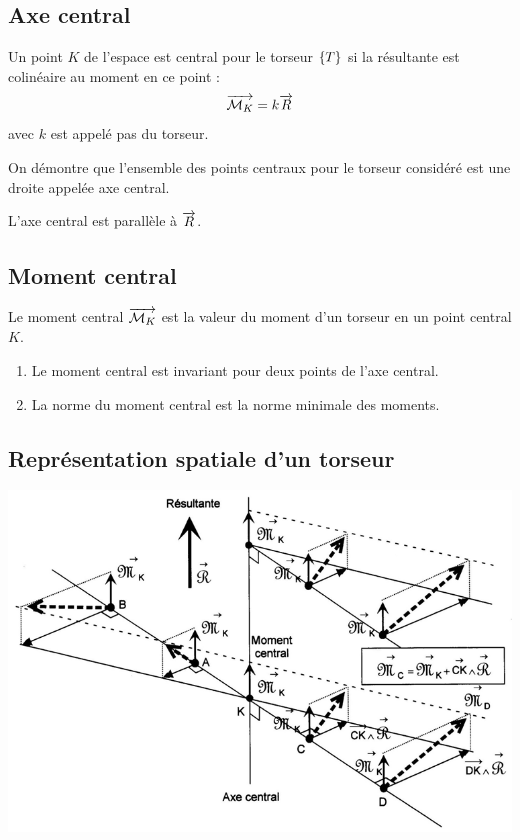 \documentclass[10pt,oneside]{article}
\begin{document}
\subsection{Axe central}
\begin{defi}
Un point $K$ de l'espace est central pour le torseur $\left\{{T}\right\}$ si la résultante est colinéaire au moment en ce point :  
$$\overrightarrow{\mathcal{M}_K} =k \overrightarrow{R}$$
avec $k$ est appelé pas du torseur.

On démontre que l'ensemble des points centraux pour le torseur considéré est une droite appelée axe central. 

L'axe central est  parallèle à  $\overrightarrow{R}$.

\end{defi}

\subsection{Moment central}
\begin{defi}
Le moment central $\overrightarrow{\mathcal{M}_K}$ est la valeur du moment d'un torseur en un point central $K$.
\end{defi}
\begin{props}
\begin{enumerate}
\item Le moment central est invariant pour deux points de l'axe central.
\item La norme du moment central est la norme minimale des moments. 
\end{enumerate}
\end{props}



\subsection{Représentation spatiale d'un torseur}

\begin{center}
\includegraphics[width=.7\textwidth]{png/fig_03}
\end{center}
\end{document}
